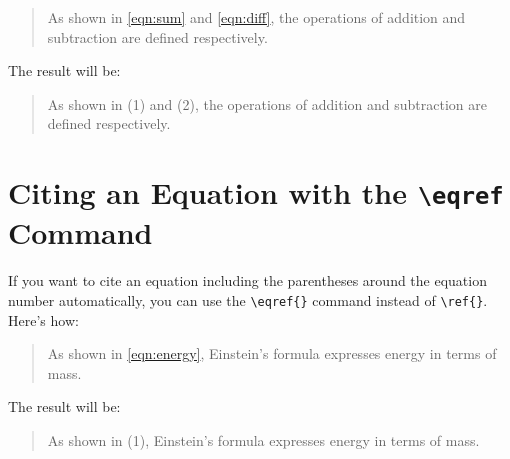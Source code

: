 \begin{quote}
	As shown in \ref{eqn:sum} and \ref{eqn:diff}, the operations of addition and subtraction are defined respectively.
\end{quote}

The result will be:

\begin{quote}
	As shown in (1) and (2), the operations of addition and subtraction are defined respectively.
\end{quote}

\section{Citing an Equation with the \texttt{\textbackslash eqref} Command}

If you want to cite an equation including the parentheses around the equation number automatically, you can use the \verb|\eqref{}| command instead of \verb|\ref{}|. Here’s how:

\begin{quote}
	As shown in \eqref{eqn:energy}, Einstein’s formula expresses energy in terms of mass.
\end{quote}

The result will be:

\begin{quote}
	As shown in (1), Einstein’s formula expresses energy in terms of mass.
\end{quote}

